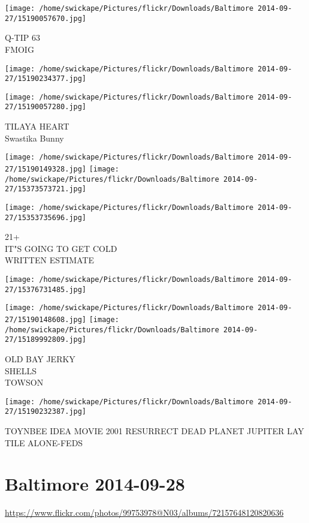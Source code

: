 \documentclass[10pt,letterpaper]{article}
\begin{document}
\vspace{0.25in}
\texttt{[image: /home/swickape/Pictures/flickr/Downloads/Baltimore 2014-09-27/15190057670.jpg]}

Q{-}TIP 63\\
FMOIG
\pagebreak

\texttt{[image: /home/swickape/Pictures/flickr/Downloads/Baltimore 2014-09-27/15190234377.jpg]}

\vspace{0.25in}
\texttt{[image: /home/swickape/Pictures/flickr/Downloads/Baltimore 2014-09-27/15190057280.jpg]}

TILAYA HEART\\
Swastika Bunny
\pagebreak

\texttt{[image: /home/swickape/Pictures/flickr/Downloads/Baltimore 2014-09-27/15190149328.jpg]}
\texttt{[image: /home/swickape/Pictures/flickr/Downloads/Baltimore 2014-09-27/15373573721.jpg]}

\texttt{[image: /home/swickape/Pictures/flickr/Downloads/Baltimore 2014-09-27/15353735696.jpg]}

21+\\
IT"S GOING TO GET COLD\\
WRITTEN ESTIMATE
\pagebreak

\texttt{[image: /home/swickape/Pictures/flickr/Downloads/Baltimore 2014-09-27/15376731485.jpg]}

\vspace{0.25in}
\texttt{[image: /home/swickape/Pictures/flickr/Downloads/Baltimore 2014-09-27/15190148608.jpg]}
\texttt{[image: /home/swickape/Pictures/flickr/Downloads/Baltimore 2014-09-27/15189992809.jpg]}

OLD BAY JERKY\\
SHELLS\\
TOWSON
\pagebreak

\texttt{[image: /home/swickape/Pictures/flickr/Downloads/Baltimore 2014-09-27/15190232387.jpg]}

TOYNBEE IDEA MOVIE 2001 RESURRECT DEAD PLANET JUPITER LAY TILE ALONE{-}FEDS
\pagebreak

\section*{Baltimore 2014-09-28}

\url{https://www.flickr.com/photos/99753978@N03/albums/72157648120820636}
\end{document}
